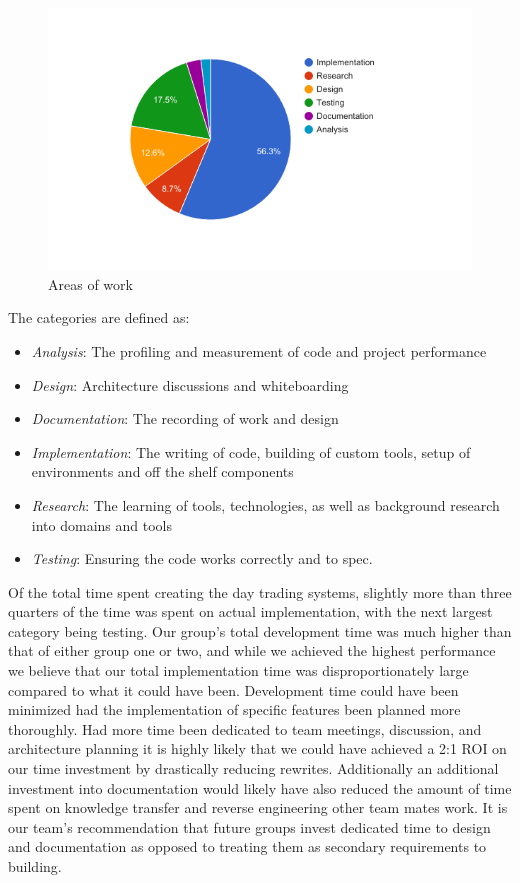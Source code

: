 \begin{figure}[tbph]
  \centering
  \includegraphics[width=0.8\linewidth]{graphics/work-pie}
  \caption{Areas of work}
  \label{fig:work-pie}
\end{figure}

The categories are defined as:

\begin{itemize}
  \item \textit{Analysis}: The profiling and measurement of code and project performance
  \item \textit{Design}: Architecture discussions and whiteboarding
  \item \textit{Documentation}: The recording of work and design
  \item \textit{Implementation}: The writing of code, building of custom tools, setup of environments and off the shelf components
  \item \textit{Research}: The learning of tools, technologies, as well as background research into domains and tools
  \item \textit{Testing}: Ensuring the code works correctly and to spec.
\end{itemize}

Of the total time spent creating the day trading systems, slightly more than three quarters of the time was spent on actual implementation, with the next largest category being testing.  Our group's total development time was much higher than that of either group one or two, and while we achieved the highest performance we believe that our total implementation time was disproportionately large compared to what it could have been.  Development time could have been minimized had the implementation of specific features been planned more thoroughly.  Had more time been dedicated to team meetings, discussion, and architecture planning it is highly likely that we could have achieved a 2:1 ROI on our time investment by drastically reducing rewrites.  Additionally an additional investment into documentation would likely have also reduced the amount of time spent on knowledge transfer and reverse engineering other team mates work.  It is our team’s recommendation that future groups invest dedicated time to design and documentation as opposed to treating them as secondary requirements to building.



